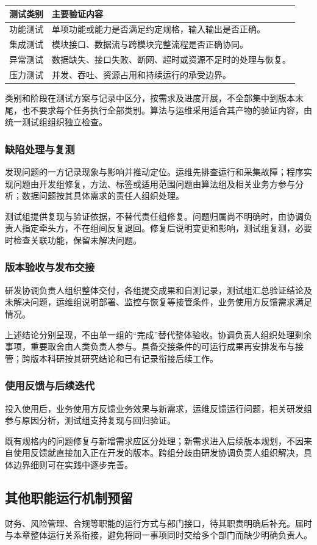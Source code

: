 \documentclass[11pt,a4paper]{article}
\begin{document}
\begin{longtable}{L{29mm}L{125mm}}
\toprule
测试类别 & 主要验证内容\\\midrule\endhead
功能测试 & 单项功能或能力是否满足约定规格，输入输出是否正确。\\
集成测试 & 模块接口、数据流与跨模块完整流程是否正确协同。\\
异常测试 & 数据缺失、接口失败、断网、超时或资源不足时的处理与恢复。\\
压力测试 & 并发、吞吐、资源占用和持续运行的承受边界。\\\bottomrule
\end{longtable}

类别和阶段在测试方案与记录中区分，按需求及进度开展，不全部集中到版本末尾，也不要求每个任务执行全部类别。算法与运维采用适合其产物的验证内容，由统一测试组组织独立检查。

\subsubsection{缺陷处理与复测}
发现问题的一方记录现象与影响并推动定位。运维先排查运行和采集故障；程序实现问题由开发组修复，方法、标签或适用范围问题由算法组及相关业务方参与分析；数据问题按其具体需求的责任人组织处理。

测试组提供复现与验证依据，不替代责任组修复。问题归属尚不明确时，由协调负责人指定牵头方，不在组间反复退回。修复后说明变更和影响，测试组复测，必要时检查关联功能，保留未解决问题。

\subsubsection{版本验收与发布交接}
研发协调负责人组织整体交付，各组提交成果和自测记录，测试组汇总验证结论及未解决问题，运维组说明部署、监控与恢复等接管条件，业务使用方反馈需求满足情况。

上述结论分别呈现，不由单一组的“完成”替代整体验收。协调负责人组织处理剩余事项，重要取舍由人类负责人参与。具备交接条件的可运行成果再安排发布与接管；跨版本科研按其研究结论和已有记录衔接后续工作。

\subsubsection{使用反馈与后续迭代}
投入使用后，业务使用方反馈业务效果与新需求，运维反馈运行问题，相关研发组参与原因分析，测试组支持复现与回归验证。

既有规格内的问题修复与新增需求应区分处理；新需求进入后续版本规划，不因来自使用反馈就直接加入正在开发的版本。跨组分歧由研发协调负责人组织解决，具体边界细则可在实践中逐步完善。


\subsection{其他职能运行机制预留}
财务、风险管理、合规等职能的运行方式与部门接口，待其职责明确后补充。届时与本章整体运行关系衔接，避免将同一事项同时交给多个部门而缺少明确负责人。
\end{document}
